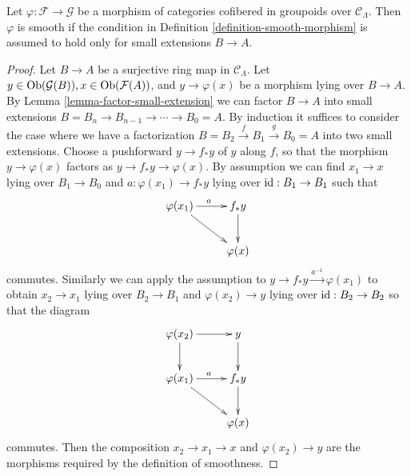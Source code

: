 \begin{lemma}
\label{lemma-smoothness-small-extensions}
Let $\varphi: \mathcal F \rightarrow \mathcal G$ be a morphism of categories 
cofibered in groupoids over $\mathcal C_{\Lambda}$.  Then $\varphi$ is smooth 
if the condition in Definition \ref{definition-smooth-morphism} is assumed to 
hold only for small extensions $B \rightarrow A$.
\end{lemma}

\begin{proof}
Let $B \rightarrow A$ be a surjective ring map in $\mathcal C_{\Lambda}$.  Let 
$y \in \textnormal{Ob}(\mathcal G(B)), x \in \textnormal{Ob}(\mathcal F(A))$, 
and $y \rightarrow \varphi(x)$ be a morphism lying over $B \rightarrow A$.  By 
Lemma \ref{lemma-factor-small-extension} we can factor $B \rightarrow A$ into 
small extensions $B = B_n \rightarrow B_{n-1} \rightarrow \cdots \rightarrow 
B_0 = A$.  By induction it suffices to consider the case where we have a 
factorization $B = B_2 \xrightarrow{f} B_1 \xrightarrow{g} B_0 = A$ into two 
small extensions.  Choose a pushforward $y \rightarrow f_* y$ of $y$ along $f$, 
so that the morphism $y \rightarrow \varphi(x)$ factors as $y \rightarrow f_* y 
\rightarrow \varphi(x)$.  By assumption we can find $x_1 \rightarrow x$ lying 
over $B_1 \rightarrow B_0$ and $a: \varphi(x_1) \rightarrow f_*y$ lying over 
$\textnormal{id}: B_1 \rightarrow B_1$ such that
\[
\xymatrix{
\varphi(x_1) \ar[r]^{a} \ar[dr] & f_*y \ar[d] \\
                        & \varphi(x)
}
\]
commutes. Similarly we can apply the assumption to $y \rightarrow f_*y 
\xrightarrow{a^{-1}} \varphi(x_1)$ to obtain $x_2 \rightarrow x_1$ lying over 
$B_2 \rightarrow B_1$ and $\varphi(x_2) \rightarrow y$ lying over 
$\textnormal{id}: B_2 \rightarrow B_2$ so that the diagram
\[
\xymatrix{
\varphi(x_2) \ar[r] \ar[d] & y \ar[d] \\
\varphi(x_1) \ar[r]^{a} \ar[dr] & f_*y \ar[d] \\
                        & \varphi(x)
}
\] 
commutes. Then the composition $x_2 \rightarrow x_1 \rightarrow x$ and 
$\varphi(x_2) \rightarrow y$ are the morphisms required by the definition of 
smoothness.
\end{proof}


